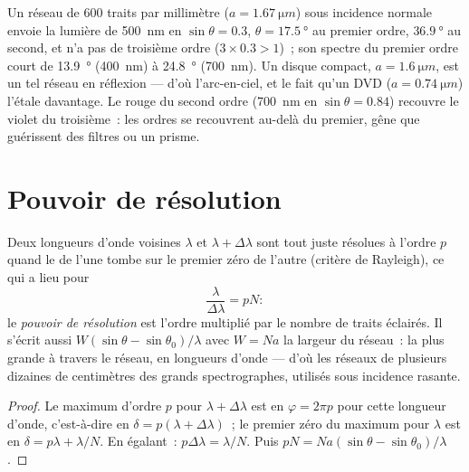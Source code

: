 \begin{example}\label{ex:b2:gratings:examples}
Un réseau de $600$ traits par millimètre ($a = \qty{1.67}{\micro m}$) sous incidence
normale envoie la lumière de \qty{500}{nm} en $\sin\theta = 0.3$, $\theta = \qty{17.5}{\degree}$ au
premier ordre, $\qty{36.9}{\degree}$ au second, et n'a pas de troisième ordre
($3 \times 0.3 > 1$)~; son spectre du premier ordre court de \qty{13.9}{\degree}
(\qty{400}{nm}) à \qty{24.8}{\degree} (\qty{700}{nm}). Un disque compact, $a =
\qty{1.6}{\micro m}$, est un tel réseau en réflexion --- d'où l'arc-en-ciel,
et le fait qu'un DVD ($a = \qty{0.74}{\micro m}$) l'étale davantage. Le
rouge du second ordre (\qty{700}{nm} en $\sin\theta = 0.84$) recouvre le violet du
troisième~: les ordres se recouvrent au-delà du premier, gêne que guérissent des filtres
ou un prisme.
\end{example}

\section{Pouvoir de résolution}

\begin{proposition}\label{prop:b2:gratings:resolution}
Deux longueurs d'onde voisines $\lambda$ et $\lambda + \Delta\lambda$ sont tout juste résolues à l'ordre $p$
quand le  de l'une tombe sur le premier zéro de l'autre
(critère de Rayleigh), ce qui a lieu pour
\[
\frac\lambda{\Delta\lambda} = pN :
\]
le \emph{pouvoir de résolution} est l'ordre multiplié par le nombre de traits
éclairés. Il s'écrit aussi $W(\sin\theta - \sin\theta_0)/\lambda$ avec $W = Na$ la
largeur du réseau~: la plus grande  à travers le réseau,
en longueurs d'onde --- d'où les réseaux de plusieurs dizaines de
centimètres des grands spectrographes, utilisés sous incidence rasante.
\end{proposition}

\begin{proof}
Le maximum d'ordre $p$ pour $\lambda + \Delta\lambda$ est en $\varphi = 2\pi p$ pour cette
longueur d'onde, c'est-à-dire en $\delta = p(\lambda + \Delta\lambda)$~; le premier zéro du maximum
pour $\lambda$ est en $\delta = p\lambda + \lambda/N$. En égalant~: $p\Delta\lambda = \lambda/N$. Puis $pN =
Na(\sin\theta - \sin\theta_0)/\lambda$.
\end{proof}

